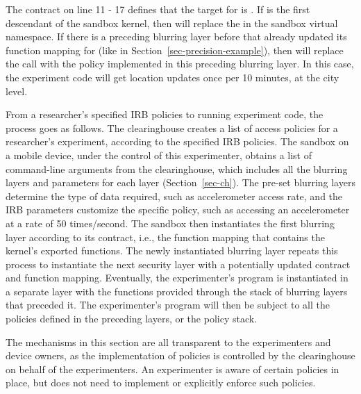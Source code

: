 The contract on line 11 - 17 defines that the target
for  is . If 
 is the first descendant of the sandbox kernel, then
 will replace the 
in the sandbox virtual namespace. If there is a preceding blurring layer 
before  that already updated its 
function mapping for  (like   
in Section~\ref{sec-precision-example}), then
 will replace the  call
with the policy implemented in this preceding blurring layer. In this case, 
the experiment code will get location updates once per 10 minutes, at
the city level. 

\bigskip
From a researcher's specified IRB policies to running experiment code, 
the process goes as follows. 
The clearinghouse creates a list of access policies for a researcher's
experiment, according to the specified IRB policies. The sandbox 
on a mobile device, under the control of
this experimenter, obtains a list of command-line arguments 
from the clearinghouse, which includes all the blurring layers
and parameters for each layer (Section~\ref{sec-ch}). The pre-set blurring layers determine
the type of data required, such as accelerometer access rate, and the 
IRB parameters customize the specific policy, such as accessing
an accelerometer at a rate of 50 times/second. 
The sandbox then %
instantiates 
the first blurring layer according to its contract, i.e., the function 
mapping that contains the kernel's exported functions.
The newly instantiated blurring layer repeats this process 
to instantiate the next
security layer with a potentially updated contract and function
mapping. Eventually, the experimenter's program is instantiated
in a separate layer with the functions provided
through the stack of blurring layers that preceded it.
The experimenter's program will then be subject to all the 
policies defined in the preceding layers, or the policy stack.

The mechanisms in this section are all transparent to the experimenters 
and device owners, as the implementation of policies is controlled by the 
clearinghouse on behalf of the experimenters. An experimenter is aware 
of certain policies in place, but does not need to implement or explicitly
enforce such policies. 